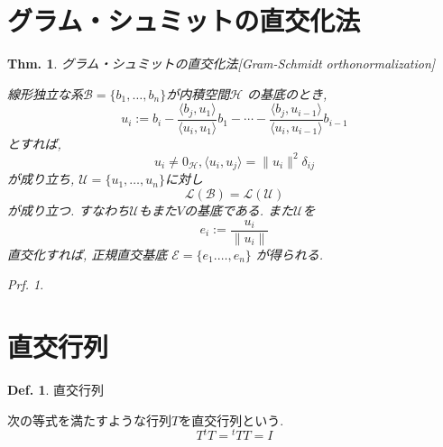 \documentclass[a4paper,10pt,report]{amsart}
\theoremstyle{plain}
\newtheorem{thm}{Thm.}[section]
\theoremstyle{definition}
\newtheorem{defn}{Def.}[section]
\theoremstyle{remark}
\newtheorem{prf}{Prf.}
\begin{document}
\section{グラム・シュミットの直交化法}
\begin{leftbar}
    \begin{thm}グラム・シュミットの直交化法[Gram-Schmidt orthonormalization]\par
        線形独立な系\(\mathcal{B}=\{b_{1},\dots,b_{n}\} \)が内積空間\(\mathcal{H}\)
        の基底のとき, 
        \begin{equation}
            u_{i}:=b_{i}-\frac{\langle b_{j},u_{1}\rangle}{\langle u_{i},u_{1}\rangle}b_{1}-\cdots-\frac{\langle b_{j},u_{i-1}\rangle}{\langle u_{i},u_{i-1}\rangle}b_{i-1}
        \end{equation}
        とすれば,
        \begin{equation}
            u_{i}\neq0_{\mathcal{H}},\langle u_{i},u_{j}\rangle=\|u_{i}\|^{2}\delta_{ij}
        \end{equation}
        が成り立ち, \(\mathcal{U}=\{u_{1},\dots,u_{n}\} \)に対し
        \begin{equation}
            \mathcal{L}(\mathcal{B})=\mathcal{L}(\mathcal{U})
        \end{equation}
        が成り立つ. すなわち\(\mathcal{U}\)もまた\(V\)の基底である. 
        また\(\mathcal{U}\)を
        \begin{equation}
            e_{i}:=\frac{u_{i}}{\|u_{i}\|}
        \end{equation}
        直交化すれば, 正規直交基底
        \(\mathcal{E}=\{e_{1}.\dots,e_{n}\} \)
        が得られる. 
    \end{thm}
\end{leftbar}
\begin{prf}
    
\end{prf}
\section{直交行列}
\begin{leftbar}
    \begin{defn}直交行列\par
        次の等式を満たすような行列\(T\)を直交行列という. 
        \begin{equation}
            T{}^{t}T={}^{t}TT=I
        \end{equation}
    \end{defn}
\end{leftbar}
\end{document}

